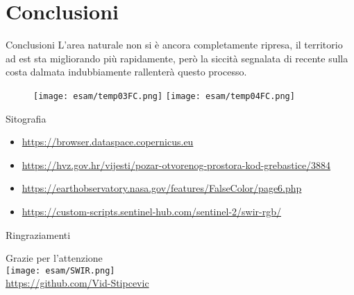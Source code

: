 \documentclass{beamer} %
\begin{document}
\section{Conclusioni}

    \begin{frame}{Conclusioni}
        L'area naturale non si è ancora completamente ripresa, il territorio ad est sta migliorando più rapidamente, però la siccità segnalata di recente sulla costa dalmata indubbiamente rallenterà questo processo.
        \begin{figure}
            \centering
            \texttt{[image: esam/temp03FC.png]}
            \texttt{[image: esam/temp04FC.png]}
        \end{figure}
    \end{frame}

    \begin{frame}{Sitografia}
        \begin{itemize}
            \item \url{https://browser.dataspace.copernicus.eu}
            \item \url{https://hvz.gov.hr/vijesti/pozar-otvorenog-prostora-kod-grebastice/3884}
            \item \url{https://earthobservatory.nasa.gov/features/FalseColor/page6.php}
            \item \url{https://custom-scripts.sentinel-hub.com/sentinel-2/swir-rgb/}
        \end{itemize}
    \end{frame}

    \begin{frame}{Ringraziamenti}
        \begin{center}
            {\huge Grazie per l'attenzione}\\
                \bigskip
                \centering
                \texttt{[image: esam/SWIR.png]}\\
                \bigskip
                \url{https://github.com/Vid-Stipcevic}
        \end{center}
    \end{frame}
\end{document}
